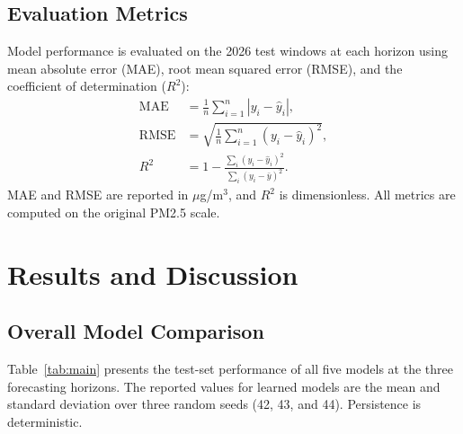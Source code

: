 \documentclass[conference]{IEEEtran}
\begin{document}
\subsection{Evaluation Metrics}
Model performance is evaluated on the 2026 test windows at each horizon using mean absolute error (MAE), root mean squared error (RMSE), and the coefficient of determination (\(R^2\)):
\begin{align}
\mathrm{MAE} &= \frac{1}{n}\sum_{i=1}^{n}\left|y_i-\hat{y}_i\right|,\\
\mathrm{RMSE} &= \sqrt{\frac{1}{n}\sum_{i=1}^{n}\left(y_i-\hat{y}_i\right)^2},\\
R^2 &= 1-\frac{\sum_{i}(y_i-\hat{y}_i)^2}{\sum_{i}(y_i-\bar{y})^2}.
\end{align}
MAE and RMSE are reported in \(\mu\)g/m\(^3\), and \(R^2\) is dimensionless. All metrics are computed on the original PM2.5 scale.

\section{Results and Discussion}

\subsection{Overall Model Comparison}

Table~\ref{tab:main} presents the test-set performance of all five models at the three forecasting horizons. The reported values for learned models are the mean and standard deviation over three random seeds (42, 43, and 44). Persistence is deterministic.
\end{document}
